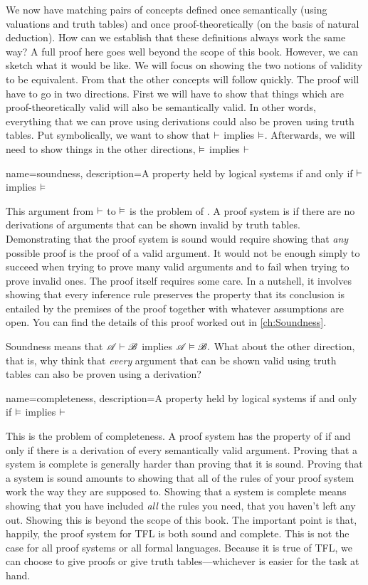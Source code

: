 We now have matching pairs of concepts defined once
semantically (using valuations and truth tables) and once
proof-theoretically (on the basis of natural deduction). How can we
establish that these definitions always work the same way? A full
proof here goes well beyond the scope of this book. However, we can
sketch what it would be like. We will focus on showing the two notions
of validity to be equivalent. From that the other concepts will follow
quickly. The proof will have to go in two directions. First we will
have to show that things which are proof-theoretically valid will also
be semantically valid. In other words, everything that we can prove
using derivations could also be proven using truth tables. Put
symbolically, we want to show that $\vdash$ implies
$\vDash$. Afterwards, we will need to show things in the
other directions, $\vDash$ implies $\vdash$

{
name=soundness,
description={A property held by logical systems if and only if $\vdash $ implies $\vDash $}
}

This argument from $\vdash $ to $\vDash $ is the problem of
.\label{def:soundness} A proof system is
 if there are no derivations of arguments that can be
shown invalid by truth tables. \label{def_Soundness} Demonstrating
that the proof system is sound would require showing that \emph{any}
possible proof is the proof of a valid argument. It would not be
enough simply to succeed when trying to prove many valid arguments and
to fail when trying to prove invalid ones. The proof itself requires
some care. In a nutshell, it involves showing that every inference
rule preserves the property that its conclusion is entailed by the
premises of the proof together with whatever assumptions are open. You
can find the details of this proof worked out in \cref{ch:Soundness}.

Soundness means that $\mathscr{A} \vdash \mathscr{B}$ implies $\mathscr{A}
\vDash \mathscr{B}.$ What about the other direction, that is, why
think that \emph{every} argument that can be shown valid using truth
tables can also be proven using a derivation? 

{
name=completeness,
description={A property held by logical systems if and only if $\vDash $ implies $\vdash $}
}

This is the problem of completeness. A proof system has the property of  \label{def:completeness} if and only if there is a derivation of every semantically valid argument. Proving that a system is complete is generally harder than proving that it is sound. Proving that a system is sound amounts to showing that all of the rules of your proof system work the way they are supposed to. Showing that a system is complete means showing that you have included \emph{all} the rules you need, that you haven't left any out. Showing this is beyond the scope of this book. The important point is that, happily, the proof system for TFL is both sound and complete. This is not the case for all proof systems or all formal languages. Because it is true of TFL, we can choose to give proofs or give truth tables---whichever is easier for the task at hand.


